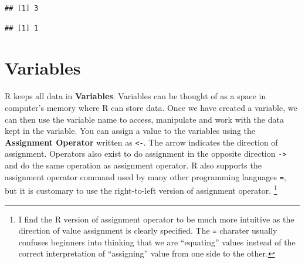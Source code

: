 \documentclass[]{krantz}
\makeatletter
\newenvironment{Shaded}{\begin{snugshade}}{\end{snugshade}}
\newcommand{\KeywordTok}[1]{\textcolor[rgb]{0.27,0.27,0.27}{\textbf{#1}}}
\newcommand{\DecValTok}[1]{\textcolor[rgb]{0.06,0.06,0.06}{#1}}
\newcommand{\StringTok}[1]{\textcolor[rgb]{0.5,0.5,0.5}{#1}}
\newcommand{\CommentTok}[1]{\textcolor[rgb]{0.56,0.35,0.01}{\textit{#1}}}
\newcommand{\OperatorTok}[1]{\textcolor[rgb]{0.81,0.36,0.00}{\textbf{#1}}}
\newcommand{\NormalTok}[1]{#1}
\newenvironment{kframe}{%
\medskip{}
\setlength{\fboxsep}{.8em}
 \def\at@end@of@kframe{}%
 \ifinner\ifhmode%
  \def\at@end@of@kframe{\end{minipage}}%
  \begin{minipage}{\columnwidth}%
 \fi\fi%
 \def\FrameCommand##1{\hskip\@totalleftmargin \hskip-\fboxsep
 \colorbox{shadecolor}{##1}\hskip-\fboxsep
     \hskip-\linewidth \hskip-\@totalleftmargin \hskip\columnwidth}%
 \MakeFramed {\advance\hsize-\width
   \@totalleftmargin\z@ \linewidth\hsize
   \@setminipage}}%
 {\par\unskip\endMakeFramed%
 \at@end@of@kframe}
\renewenvironment{Shaded}{\begin{kframe}}{\end{kframe}}
\theoremstyle{definition}
\theoremstyle{definition}
\theoremstyle{definition}
\theoremstyle{remark}
\makeatother
\begin{document}
\begin{Shaded}
\end{Shaded}

\begin{verbatim}
## [1] 3
\end{verbatim}

\begin{Shaded}
\end{Shaded}

\begin{verbatim}
## [1] 1
\end{verbatim}

\section{Variables}\label{variables}

R keeps all data in \textbf{Variables}. Variables can be thought of as a
space in computer's memory where R can store data. Once we have created
a variable, we can then use the variable name to access, manipulate and
work with the data kept in the variable. You can assign a value to the
variables using the \textbf{Assignment Operator} written as
\texttt{\textless{}-}. The arrow indicates the direction of assignment.
Operators also exist to do assignment in the opposite direction
\texttt{-\textgreater{}} and do the same operation as assignment
operator. R also supports the assignment operator command used by many
other programming languages \texttt{=}, but it is customary to use the
right-to-left version of assignment operator. \footnote{I find the R
  version of assignment operator to be much more intuitive as the
  direction of value assignment is clearly specified. The \texttt{=}
  charater usually confuses beginners into thinking that we are
  ``equating'' values instead of the correct interpretation of
  ``assigning'' value from one side to the other.}

\begin{Shaded}
\end{Shaded}
\end{document}
